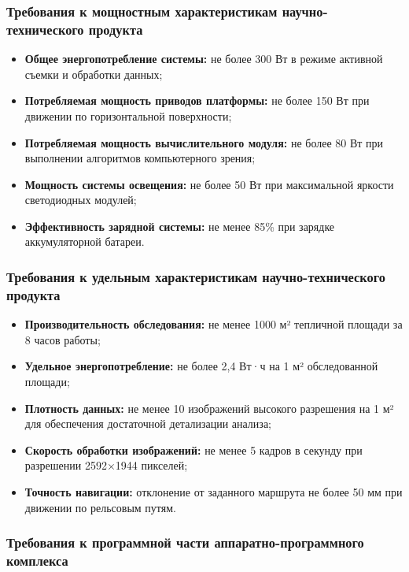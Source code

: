 \documentclass[12pt,a4paper]{article}
\begin{document}
\subsubsection{Требования к мощностным характеристикам научно-технического продукта}

\begin{itemize}
\item \textbf{Общее энергопотребление системы:} не более 300 Вт в режиме активной съемки и обработки данных;
\item \textbf{Потребляемая мощность приводов платформы:} не более 150 Вт при движении по горизонтальной поверхности;
\item \textbf{Потребляемая мощность вычислительного модуля:} не более 80 Вт при выполнении алгоритмов компьютерного зрения;
\item \textbf{Мощность системы освещения:} не более 50 Вт при максимальной яркости светодиодных модулей;
\item \textbf{Эффективность зарядной системы:} не менее 85\% при зарядке аккумуляторной батареи.
\end{itemize}

\subsubsection{Требования к удельным характеристикам научно-технического продукта}

\begin{itemize}
\item \textbf{Производительность обследования:} не менее 1000 м² тепличной площади за 8 часов работы;
\item \textbf{Удельное энергопотребление:} не более 2,4 Вт·ч на 1 м² обследованной площади;
\item \textbf{Плотность данных:} не менее 10 изображений высокого разрешения на 1 м² для обеспечения достаточной детализации анализа;
\item \textbf{Скорость обработки изображений:} не менее 5 кадров в секунду при разрешении 2592×1944 пикселей;
\item \textbf{Точность навигации:} отклонение от заданного маршрута не более 50 мм при движении по рельсовым путям.
\end{itemize}

\subsubsection{Требования к программной части аппаратно-программного комплекса}
\end{document}
